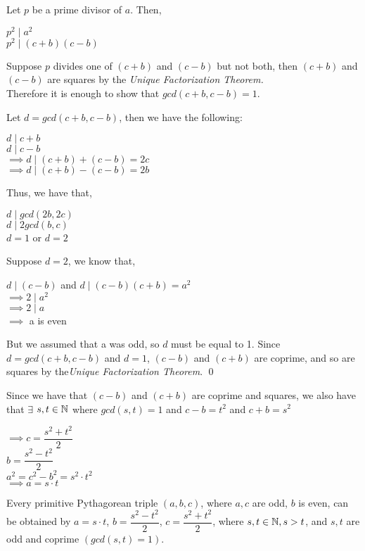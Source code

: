\documentclass[../main.tex]{subfiles}
\begin{document}
\begin{pf}
    Let $p$ be a prime divisor of $a$. Then, 
    \begin{center}
        $p^2 \mid a^2$ \\
        $p^2 \mid (c + b)(c - b)$
    \end{center}

    Suppose $p$ divides one of $(c + b)$ and $(c - b)$ but not both, then $(c + b)$ and $(c - b)$ are squares by the \textit{Unique Factorization Theorem.} \\ 
    Therefore it is enough to show that $gcd(c + b, c - b) = 1$.
    
    Let $d = gcd(c + b, c - b)$, then we have the following:
    \begin{center}
        $d \mid c + b$ \\
        $d \mid c - b$ \\
        $\implies d \mid (c + b) + (c - b) = 2c$ \\
        $\implies d \mid (c + b) - (c - b) = 2b$ \\
    \end{center}
\end{pf}
\begin{pf}[Cont.]
    Thus, we have that,
    \begin{center}
        $d \mid gcd(2b, 2c)$ \\
        $d \mid 2gcd(b, c)$ \\
        $d = 1$ or $d = 2$
    \end{center}
    Suppose $d = 2$, we know that,
    \begin{center}
        $d \mid (c-b)$ and $d \mid (c-b)(c+b) = a^2$ \\
        $\implies 2 \mid a^2$ \\
        $\implies 2 \mid a$ \\
        $\implies$ a is even
    \end{center}
    But we assumed that a was odd, so $d$ must be equal to 1. Since $d=gcd(c+b,c-b)$ and $d=1$, $(c-b)$ and $(c+b)$ are coprime, and so are squares by the\textit{Unique Factorization Theorem}. \qed
\end{pf}
Since we have that $(c-b)$ and $(c+b)$ are coprime and squares, we also have that $\exists$ $s, t \in \mathbb{N}$ where $gcd(s,t)=1$ and $c-b = t^2$ and $c+b = s^2$
\begin{center}
    $\implies c = \dfrac{s^2+t^2}{2}$ \\
    $b = \dfrac{s^2-t^2}{2}$ \\
    $a^2 = c^2 - b^2 = s^2 \cdot t^2$ \\
    $\implies a = s \cdot t$
\end{center}
\begin{thm}
    Every primitive Pythagorean triple $(a,b,c)$, where $a,c$ are odd, $b$ is even, can be obtained by $a=s \cdot t$, $b=\dfrac{s^2 - t^2}{2}$, $c=\dfrac{s^2 + t^2}{2}$, where $s,t \in \mathbb{N}, s > t$, and $s,t$ are odd and coprime $(gcd(s,t)=1)$.
\end{thm}
\end{document}
